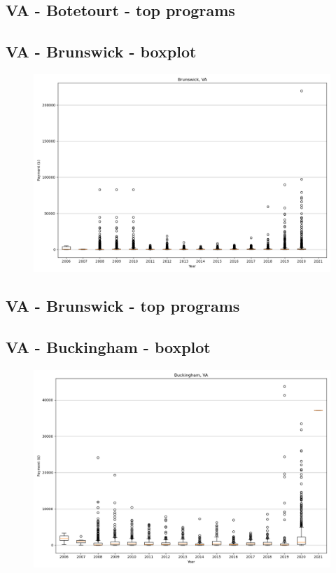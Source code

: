 \subsection*{VA - Botetourt - top programs}

\newpage
\subsection*{VA - Brunswick - boxplot}
\begin{figure}[h]
\centering
\includegraphics[width=7in]{../output/boxplots/counties/Brunswick-VA_boxplot.png}
\end{figure}


\subsection*{VA - Brunswick - top programs}

\newpage
\subsection*{VA - Buckingham - boxplot}
\begin{figure}[h]
\centering
\includegraphics[width=7in]{../output/boxplots/counties/Buckingham-VA_boxplot.png}
\end{figure}


